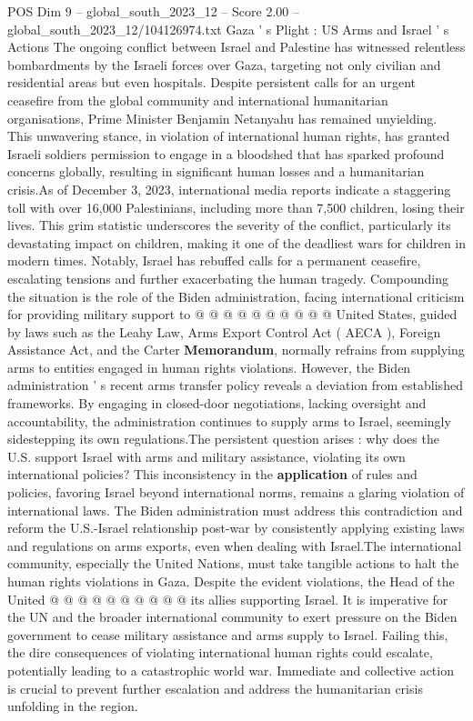\begin{textsample}{POS Dim 9 – global\_south\_2023\_12 – Score 2.00 – global\_south\_2023\_12/104126974.txt}  \label{ex:f9_pos_142}
Gaza ' s Plight : US Arms and Israel ' s Actions The ongoing conflict between Israel and Palestine has witnessed relentless bombardments by the Israeli forces over Gaza, targeting not only civilian and residential areas but even hospitals.
Despite persistent calls for an urgent ceasefire from the global community and international humanitarian organisations, Prime Minister Benjamin Netanyahu has remained unyielding.
This unwavering stance, in violation of international human rights, has granted Israeli soldiers permission to engage in a bloodshed that has sparked profound concerns globally, resulting in significant human losses and a humanitarian crisis.As of December 3, 2023, international media reports indicate a staggering toll with over 16,000 Palestinians, including more than 7,500 children, losing their lives.
This grim statistic underscores the severity of the conflict, particularly its devastating impact on children, making it one of the deadliest wars for children in modern times.
Notably, Israel has rebuffed calls for a permanent ceasefire, escalating tensions and further exacerbating the human tragedy.
Compounding the situation is the role of the Biden administration, facing international criticism for providing military support to @ @ @ @ @ @ @ @ @ @ United States, guided by laws such as the Leahy Law, Arms Export Control Act ( AECA ), Foreign Assistance Act, and the Carter \textbf{Memorandum}, normally refrains from supplying arms to entities engaged in human rights violations.
However, the Biden administration ' s recent arms transfer policy reveals a deviation from established frameworks.
By engaging in closed-door negotiations, lacking oversight and accountability, the administration continues to supply arms to Israel, seemingly sidestepping its own regulations.The persistent question arises : why does the U.S. support Israel with arms and military assistance, violating its own international policies?
This inconsistency in the \textbf{application} of rules and policies, favoring Israel beyond international norms, remains a glaring violation of international laws.
The Biden administration must address this contradiction and reform the U.S.-Israel relationship post-war by consistently applying existing laws and regulations on arms exports, even when dealing with Israel.The international community, especially the United Nations, must take tangible actions to halt the human rights violations in Gaza.
Despite the evident violations, the Head of the United @ @ @ @ @ @ @ @ @ @ its allies supporting Israel.
It is imperative for the UN and the broader international community to exert pressure on the Biden government to cease military assistance and arms supply to Israel.
Failing this, the dire consequences of violating international human rights could escalate, potentially leading to a catastrophic world war.
Immediate and collective action is crucial to prevent further escalation and address the humanitarian crisis unfolding in the region.

\end{textsample}
